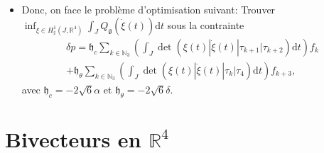 \documentclass[12pt,a4paper]{article}
\theoremstyle{plain}
\theoremstyle{plain}
\theoremstyle{plain}
\theoremstyle{definition}
\theoremstyle{definition}
\theoremstyle{definition}
\theoremstyle{plain}
\newcommand{\N}{\mathbb{N}}
\newcommand{\R}{\mathbb{R}}
\newcommand{\dd}[1]{\mathrm{d}#1}
\begin{document}
\begin{itemize}
\item Donc, on face le problème d'optimisation suivant: Trouver $ \inf_{\xi \in H_{\sharp}^1(J, \R^4)} \int_{J} Q_{\mathfrak{g}}(\dot{\xi}(t)) \dd t$ sous la contrainte 
\begin{align}
\label{eq: constraint}
\delta p = \mathfrak{h}_{c} \sum_{k \in \N_3}\left ( \int_{J} \det( \xi(t) | \dot{\xi}(t) | \tau_{k+1} | \tau_{k+2}) \dd t \right ) f_k\\
	+ \mathfrak{h}_{\theta}  \sum_{k \in \N_3}\left ( \int_{J} \det ( \xi(t) | \dot{\xi}(t) | \tau_{k} | \tau_{4}) \dd t\right ) f_{k + 3} \nonumber,
\end{align}
	avec $\mathfrak{h}_c = - 2 \sqrt{6} \alpha$ et $\mathfrak{h}_{\theta} = - 2 \sqrt{6} \delta$.
\end{itemize}


\section{Bivecteurs en $\R^4$}
\end{document}
